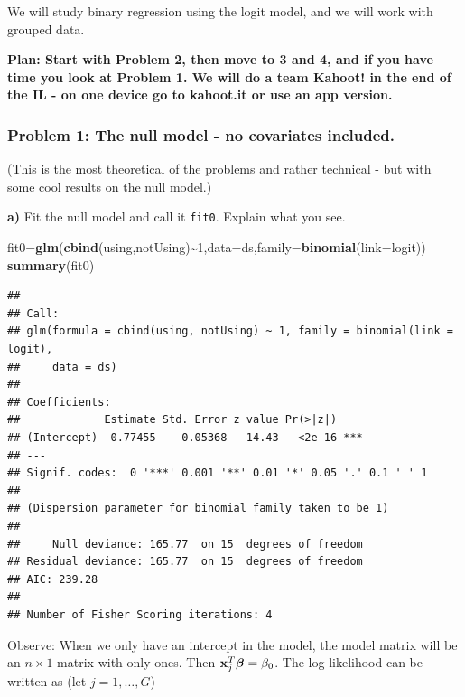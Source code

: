 \documentclass[
]{article}
\newenvironment{Shaded}{\begin{snugshade}}{\end{snugshade}}
\newcommand{\AttributeTok}[1]{\textcolor[rgb]{0.13,0.29,0.53}{#1}}
\newcommand{\DecValTok}[1]{\textcolor[rgb]{0.00,0.00,0.81}{#1}}
\newcommand{\FunctionTok}[1]{\textcolor[rgb]{0.13,0.29,0.53}{\textbf{#1}}}
\newcommand{\NormalTok}[1]{#1}
\newcommand{\OtherTok}[1]{\textcolor[rgb]{0.56,0.35,0.01}{#1}}
\newcommand{\SpecialCharTok}[1]{\textcolor[rgb]{0.81,0.36,0.00}{\textbf{#1}}}
\begin{document}
We will study binary regression using the logit model, and we will work
with grouped data.

\textbf{Plan: Start with Problem 2, then move to 3 and 4, and if you
have time you look at Problem 1. We will do a team Kahoot! in the end of
the IL - on one device go to kahoot.it or use an app version. }

\hypertarget{problem-1-the-null-model---no-covariates-included.}{%
\subsubsection{Problem 1: The null model - no covariates
included.}\label{problem-1-the-null-model---no-covariates-included.}}

(This is the most theoretical of the problems and rather technical - but
with some cool results on the null model.)

\textbf{a)} Fit the null model and call it \texttt{fit0}. Explain what
you see.

\begin{Shaded}
\begin{Highlighting}[]
\NormalTok{fit0}\OtherTok{=}\FunctionTok{glm}\NormalTok{(}\FunctionTok{cbind}\NormalTok{(using,notUsing)}\SpecialCharTok{\textasciitilde{}}\DecValTok{1}\NormalTok{,}\AttributeTok{data=}\NormalTok{ds,}\AttributeTok{family=}\FunctionTok{binomial}\NormalTok{(}\AttributeTok{link=}\NormalTok{logit))}
\FunctionTok{summary}\NormalTok{(fit0)}
\end{Highlighting}
\end{Shaded}

\begin{verbatim}
## 
## Call:
## glm(formula = cbind(using, notUsing) ~ 1, family = binomial(link = logit), 
##     data = ds)
## 
## Coefficients:
##             Estimate Std. Error z value Pr(>|z|)    
## (Intercept) -0.77455    0.05368  -14.43   <2e-16 ***
## ---
## Signif. codes:  0 '***' 0.001 '**' 0.01 '*' 0.05 '.' 0.1 ' ' 1
## 
## (Dispersion parameter for binomial family taken to be 1)
## 
##     Null deviance: 165.77  on 15  degrees of freedom
## Residual deviance: 165.77  on 15  degrees of freedom
## AIC: 239.28
## 
## Number of Fisher Scoring iterations: 4
\end{verbatim}

Observe: When we only have an intercept in the model, the model matrix
will be an \(n \times 1\)-matrix with only ones. Then
\({\bf x}_j^T\boldsymbol{\beta}=\beta_0\). The log-likelihood can be
written as (let \(j=1,\ldots,G\))
\end{document}
